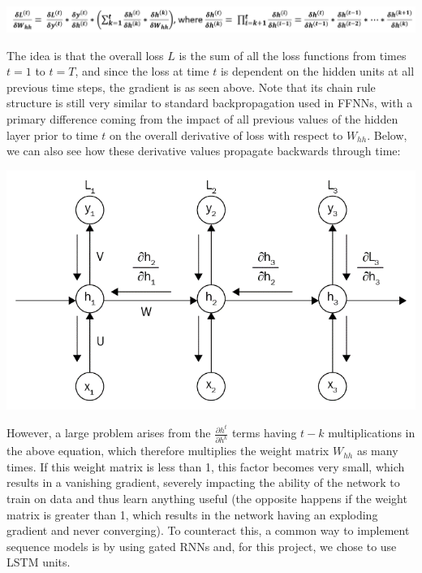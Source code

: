 \documentclass[12pt,twoside]{report}
\begin{document}
\begin{center}
\includegraphics[scale=0.27]{project_figures/fig3_4}
\end{center}

\quad The idea is that the overall loss $L$ is the sum of all the loss functions from times $t=1$ to $t=T$, and since the loss at time $t$ is dependent on the hidden units at all previous time steps, the gradient is as seen above. Note that its chain rule structure is still very similar to standard backpropagation used in FFNNs, with a primary difference coming from the impact of all previous values of the hidden layer prior to time $t$ on the overall derivative of loss with respect to $W_{hh}$. Below, we can also see how these derivative values propagate backwards through time:\\

\begin{center}
\includegraphics[scale=1.0]{project_figures/fig3_5}
\end{center}

\quad However, a large problem arises from the $\frac{\partial h^t}{\partial h^k}$  terms having $t-k$ multiplications in the above equation, which therefore multiplies the weight matrix $W_{hh}$ as many times. If this weight matrix is less than 1, this factor becomes very small, which results in a vanishing gradient, severely impacting the ability of the network to train on data and thus learn anything useful (the opposite happens if the weight matrix is greater than 1, which results in the network having an exploding gradient and never converging). To counteract this, a common way to implement sequence models is by using gated RNNs and, for this project, we chose to use LSTM units.\\
\end{document}
